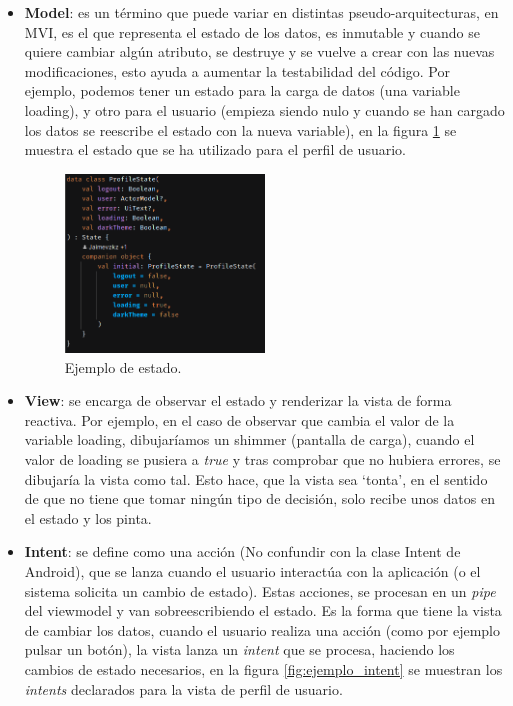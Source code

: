 \begin{itemize}
    \item \textbf{Model}: es un término que puede variar en distintas pseudo-arquitecturas, en MVI, es el que representa el estado de los datos, es inmutable y cuando se quiere cambiar algún atributo, se destruye y se vuelve a crear con las nuevas modificaciones, esto ayuda a aumentar la testabilidad del código. Por ejemplo, podemos tener un estado para la carga de datos (una  variable loading), y otro para el usuario (empieza siendo nulo y cuando se han cargado los datos se reescribe el estado con la nueva variable), en la figura \ref{fig:ejemplo_estado} se muestra el estado que se ha utilizado para el perfil de usuario.
    \begin{figure}[h]
        \centering
        \includegraphics[width = 0.5\textwidth]{Imagenes/Fuentes/ejemplo_estado.png}
        \caption{Ejemplo de estado.}
        \label{fig:ejemplo_estado}
    \end{figure}
    \item \textbf{View}: se encarga de observar el estado y renderizar la vista de forma reactiva. Por ejemplo, en el caso de observar que cambia el valor de la variable loading, dibujaríamos un shimmer (pantalla de carga), cuando el valor de loading se pusiera a \textit{true} y tras comprobar que no hubiera errores, se dibujaría la vista como tal. Esto hace, que la vista sea ‘tonta’, en el sentido de que no tiene que tomar ningún tipo de decisión, solo recibe unos datos en el estado y los pinta.
    \item \textbf{Intent}: se define como una acción (No confundir con la clase Intent de Android\hyperlink{cap:biblio}{}), que se lanza cuando el usuario interactúa con la aplicación (o el sistema solicita un cambio de estado). Estas acciones, se procesan en un \textit{pipe} del viewmodel y van sobreescribiendo el estado. Es la forma que tiene la vista de cambiar los datos, cuando el usuario realiza una acción (como por ejemplo pulsar un botón), la vista lanza un \textit{intent} que se procesa, haciendo los cambios de estado necesarios, en la figura \ref{fig:ejemplo_intent} se muestran los \textit{intents} declarados para la vista de perfil de usuario.

\end{itemize}
